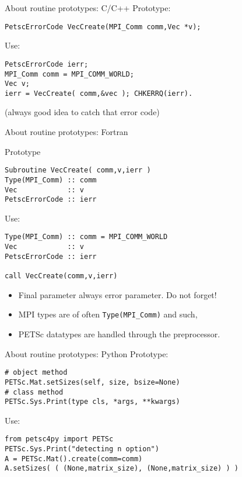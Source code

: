 
\begin{frame}[containsverbatim]{About routine prototypes: C/C++}
  \label{sec:protos}
Prototype:
\begin{lstlisting}
PetscErrorCode VecCreate(MPI_Comm comm,Vec *v);
\end{lstlisting}
Use:
\begin{lstlisting}
PetscErrorCode ierr;
MPI_Comm comm = MPI_COMM_WORLD;
Vec v;
ierr = VecCreate( comm,&vec ); CHKERRQ(ierr).
\end{lstlisting}
(always good idea to catch that error code)
\end{frame}

\lstset{language=Fortran}
\begin{frame}[containsverbatim]{About routine prototypes: Fortran}
\begin{multicols}{2}
\footnotesize
Prototype
\begin{lstlisting}
Subroutine VecCreate( comm,v,ierr )
Type(MPI_Comm) :: comm
Vec            :: v
PetscErrorCode :: ierr
\end{lstlisting}
Use:
\begin{lstlisting}
Type(MPI_Comm) :: comm = MPI_COMM_WORLD
Vec            :: v
PetscErrorCode :: ierr

call VecCreate(comm,v,ierr)
\end{lstlisting}
\columnbreak
\begin{itemize}
\item Final parameter always error parameter. Do not forget!
\item MPI types are of often \lstinline{Type(MPI_Comm)} and such,
\item PETSc datatypes are handled through the preprocessor.
\end{itemize}
\hbox{}\vfill\hbox{}
\end{multicols}
\end{frame}

\lstset{language=Python}
\begin{frame}[containsverbatim]{About routine prototypes: Python}
Prototype:
\begin{lstlisting}
# object method
PETSc.Mat.setSizes(self, size, bsize=None)
# class method
PETSc.Sys.Print(type cls, *args, **kwargs)
\end{lstlisting}
Use:
\begin{lstlisting}
from petsc4py import PETSc
PETSc.Sys.Print("detecting n option")
A = PETSc.Mat().create(comm=comm)
A.setSizes( ( (None,matrix_size), (None,matrix_size) ) )
\end{lstlisting}
\end{frame}


